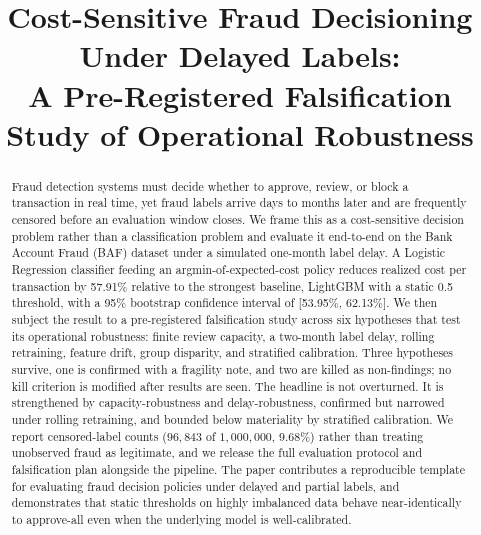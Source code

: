 \documentclass[conference]{IEEEtran}
\begin{document}
\title{Cost-Sensitive Fraud Decisioning Under Delayed Labels:\\
A Pre-Registered Falsification Study of Operational Robustness}

\author{
}

\maketitle

\begin{abstract}
Fraud detection systems must decide whether to approve, review, or block a
transaction in real time, yet fraud labels arrive days to months later and
are frequently censored before an evaluation window closes. We frame this
as a cost-sensitive decision problem rather than a classification problem
and evaluate it end-to-end on the Bank Account Fraud (BAF) dataset under a
simulated one-month label delay. A Logistic Regression classifier feeding an
argmin-of-expected-cost policy reduces realized cost per transaction by
57.91\% relative to the strongest baseline, LightGBM with a static 0.5
threshold, with a 95\% bootstrap confidence interval of [53.95\%, 62.13\%].
We then subject the result to a pre-registered falsification study across
six hypotheses that test its operational robustness: finite review capacity,
a two-month label delay, rolling retraining, feature drift, group disparity,
and stratified calibration. Three hypotheses survive, one is confirmed with
a fragility note, and two are killed as non-findings; no kill criterion is
modified after results are seen. The headline is not overturned. It is
strengthened by capacity-robustness and delay-robustness, confirmed but
narrowed under rolling retraining, and bounded below materiality by
stratified calibration. We report censored-label counts ($96{,}843$ of
$1{,}000{,}000$, $9.68\%$) rather than treating unobserved fraud as
legitimate, and we release the full evaluation protocol and falsification
plan alongside the pipeline. The paper contributes a reproducible template
for evaluating fraud decision policies under delayed and partial labels, and
demonstrates that static thresholds on highly imbalanced data behave
near-identically to approve-all even when the underlying model is
well-calibrated.
\end{abstract}
\end{document}
